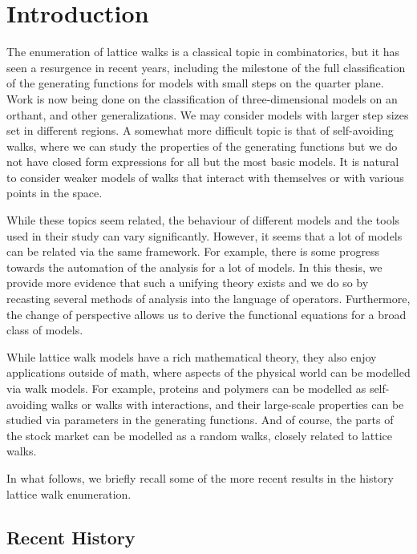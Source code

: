 
\chapter{Introduction}
\label{ch:Introduction}

The enumeration of lattice walks is a classical topic in combinatorics, but it has seen a resurgence in recent years, including the milestone of the full classification of the generating functions for models with small steps on the quarter plane. Work is now being done on the classification of three-dimensional models on an orthant, and other generalizations. We may consider models with larger step sizes set in different regions. A somewhat more difficult topic is that of self-avoiding walks, where we can study the properties of the generating functions but we do not have closed form expressions for all but the most basic models. It is natural to consider weaker models of walks that interact with themselves or with various points in the space.

While these topics seem related, the behaviour of different models and the tools used in their study can vary significantly. However, it seems that a lot of models can be related via the same framework. For example, there is some progress towards the automation of the analysis for a lot of models. In this thesis, we provide more evidence that such a unifying theory exists and we do so by recasting several methods of analysis into the language of operators. Furthermore, the change of perspective allows us to derive the functional equations for a broad class of models.

While lattice walk models have a rich mathematical theory, they also enjoy applications outside of math, where aspects of the physical world can be modelled via walk models. For example, proteins and polymers can be modelled as self-avoiding walks or walks with interactions, and their large-scale properties can be studied via parameters in the generating functions. And of course, the parts of the stock market can be modelled as a random walks, closely related to lattice walks.

In what follows, we briefly recall some of the more recent results in the history lattice walk enumeration.


\section{Recent History}

